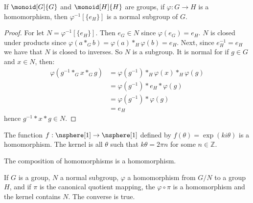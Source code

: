 \documentclass{book}                                                           %
\begin{document}
            \begin{theorem}
                If $\monoid[G]{G}$ and $\monoid[H]{H}$ are groups, if
                $\varphi:G\rightarrow{H}$ is a homomorphism, then
                $\varphi^{\minus{1}}[\{e_{H}\}]$ is a normal subgroup of
                $G$.
            \end{theorem}
            \begin{proof}
                For let $N=\varphi^{\minus{1}}[\{e_{H}\}]$. Then
                $e_{G}\in{N}$ since $\varphi(e_{G})=e_{H}$. $N$ is closed
                under products since
                $\varphi(a*_{G}b)=\varphi(a)*_{H}\varphi(b)=e_{H}$. Next,
                since $e_{H}^{\minus{1}}=e_{H}$ we have that $N$ is closed
                to inverses. So $N$ is a subgroup. It is normal for if
                $g\in{G}$ and $x\in{N}$, then:
                \begin{subequations}
                    \begin{align}
                        \varphi(g^{\minus{1}}*_{G}x*_{G}g)
                        &=\varphi(g^{\minus{1}})*_{H}
                            \varphi(x)*_{H}\varphi(g)\\
                        &=\varphi(g^{\minus{1}})*e_{H}*\varphi(g)\\
                        &=\varphi(g^{\minus{1}})*\varphi(g)\\
                        &=e_{H}
                    \end{align}
                \end{subequations}
                hence $g^{\minus{1}}*x*g\in{N}$.
            \end{proof}
            \begin{example}
                The function $f:\nsphere[1]\rightarrow\nsphere[1]$ defined
                by $f(\theta)=\exp(ki\theta)$ is a homomorphism. The
                kernel is all $\theta$ such that $k\theta=2\pi{n}$ for some
                $n\in\mathbb{Z}$.
            \end{example}
            \begin{theorem}
                The composition of homomorphisms is a homomorphism.
            \end{theorem}
            If $G$ is a group, $N$ a normal subgroup, $\varphi$ a
            homomorphism from $G/N$ to a group $H$, and if $\pi$ is the
            canonical quotient mapping, the $\varphi\circ\pi$ is a
            homomorphism and the kernel contains $N$. The converse is true.
\end{document}
